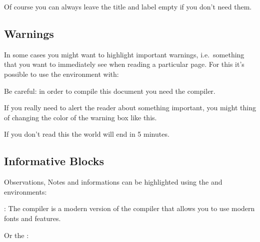\documentclass[../main.tex]{subfiles}
\begin{document}
Of course you can always leave the title and label empty if you don't need them.

\pagebreak
\subsection{Warnings}

In some cases you might want to highlight important warnings, i.e.\ something
that you want to immediately see when reading a particular page. For this it's
possible to use the  environment with:

\begin{center}
\end{center}

\begin{warning}
	Be careful: in order to compile this document you need the  compiler.
\end{warning}

If you really need to alert the reader about something important, you might thing of changing the color of the warning box like this.

\begin{warning}
	If you don't read this the world will end in 5 minutes. 
\end{warning}

\vspace{2cm}

\subsection{Informative Blocks}

Observations, Notes and informations can be highlighted using the  and
 environments:

\begin{center}
\end{center}

\begin{info}
	: The  compiler is a modern version of the  compiler that allows you to use modern fonts and features.
\end{info}

Or the :

\begin{center}
\end{center}
\end{document}
